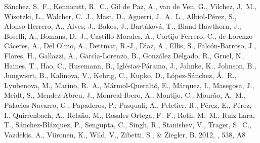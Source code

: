 \begin{thebibliography}
{S{\'a}nchez}, S.~F., {Kennicutt}, R.~C., {Gil de Paz}, A., {van de Ven}, G.,
  {V{\'{\i}}lchez}, J.~M., {Wisotzki}, L., {Walcher}, C.~J., {Mast}, D.,
  {Aguerri}, J.~A.~L., {Albiol-P{\'e}rez}, S., {Alonso-Herrero}, A., {Alves},
  J., {Bakos}, J., {Bart{\'a}kov{\'a}}, T., {Bland-Hawthorn}, J., {Boselli},
  A., {Bomans}, D.~J., {Castillo-Morales}, A., {Cortijo-Ferrero}, C., {de
  Lorenzo-C{\'a}ceres}, A., {Del Olmo}, A., {Dettmar}, R.-J., {D{\'{\i}}az},
  A., {Ellis}, S., {Falc{\'o}n-Barroso}, J., {Flores}, H., {Gallazzi}, A.,
  {Garc{\'{\i}}a-Lorenzo}, B., {Gonz{\'a}lez Delgado}, R., {Gruel}, N.,
  {Haines}, T., {Hao}, C., {Husemann}, B., {Igl{\'e}sias-P{\'a}ramo}, J.,
  {Jahnke}, K., {Johnson}, B., {Jungwiert}, B., {Kalinova}, V., {Kehrig}, C.,
  {Kupko}, D., {L{\'o}pez-S{\'a}nchez}, {\'A}.~R., {Lyubenova}, M., {Marino},
  R.~A., {M{\'a}rmol-Queralt{\'o}}, E., {M{\'a}rquez}, I., {Masegosa}, J.,
  {Meidt}, S., {Mendez-Abreu}, J., {Monreal-Ibero}, A., {Montijo}, C.,
  {Mour{\~a}o}, A.~M., {Palacios-Navarro}, G., {Papaderos}, P., {Pasquali}, A.,
  {Peletier}, R., {P{\'e}rez}, E., {P{\'e}rez}, I., {Quirrenbach}, A.,
  {Rela{\~n}o}, M., {Rosales-Ortega}, F.~F., {Roth}, M.~M., {Ruiz-Lara}, T.,
  {S{\'a}nchez-Bl{\'a}zquez}, P., {Sengupta}, C., {Singh}, R., {Stanishev}, V.,
  {Trager}, S.~C., {Vazdekis}, A., {Viironen}, K., {Wild}, V., {Zibetti}, S.,
  \& {Ziegler}, B. 2012{}, \aap, 538, A8



\end{thebibliography}
